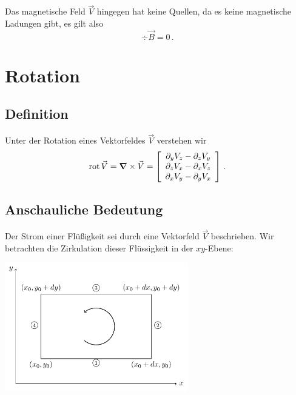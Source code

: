 \documentclass[paper=a4, fontsize=11.0pt, abstractoff, DIV12]{scrartcl}
\begin{document}
Das magnetische Feld $\vec V$ hingegen hat keine Quellen, da es keine
magnetische Ladungen gibt, es gilt also
\begin{equation}
\div \vec B = 0\,.
\end{equation}


\section{Rotation}

\subsection{Definition}

Unter der Rotation eines Vektorfeldes $\vec V$ verstehen wir
\begin{equation}
\rot \vec V = \nabla \times \vec V = \DreierVec{\partial_y V_z - \partial_z V_y}{\partial_zV_x - \partial_x V_z}{\partial_x V_y - \partial_y V_x}\,.
\label{eq:rotDef}
\end{equation}

\subsection{Anschauliche Bedeutung}

Der Strom einer Flüßigkeit sei durch eine Vektorfeld $\vec V$ beschrieben.
Wir betrachten die Zirkulation dieser Flüssigkeit in der $xy$-Ebene:

\begin{center}
    \includegraphics[width=0.6\textwidth]{Figures/Rot}
\end{center}
\end{document}

